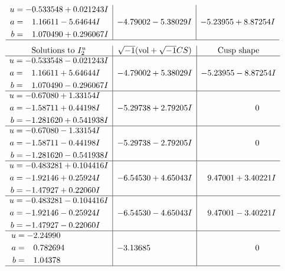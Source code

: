 \documentclass[1p]{elsarticle_modified}
\theoremstyle{definition}
\newcommand{\I}{\sqrt{-1}}
\begin{document}
$$\begin{array}{c|c|c}
\begin{aligned}
u &= -0.533548 + 0.021243 I \\
a &= \phantom{-}1.16611 - 5.64644 I \\
b &= \phantom{-}1.070490 + 0.296067 I\end{aligned}
 & -4.79002 - 5.38029 I & -5.23955 + 8.87254 I\\
 \hline 
 \end{array}$$\newpage$$\begin{array}{c|c|c}  
\text{Solutions to }I^u_{2}& \I (\text{vol} + \sqrt{-1}CS) & \text{Cusp shape}\\
 \hline 
\begin{aligned}
u &= -0.533548 - 0.021243 I \\
a &= \phantom{-}1.16611 + 5.64644 I \\
b &= \phantom{-}1.070490 - 0.296067 I\end{aligned}
 & -4.79002 + 5.38029 I & -5.23955 - 8.87254 I \\ \hline\begin{aligned}
u &= -0.67080 + 1.33154 I \\
a &= -1.58711 + 0.44198 I \\
b &= -1.281620 + 0.541938 I\end{aligned}
 & -5.29738 + 2.79205 I & \phantom{-0.000000 } 0 \\ \hline\begin{aligned}
u &= -0.67080 - 1.33154 I \\
a &= -1.58711 - 0.44198 I \\
b &= -1.281620 - 0.541938 I\end{aligned}
 & -5.29738 - 2.79205 I & \phantom{-0.000000 } 0 \\ \hline\begin{aligned}
u &= -0.483281 + 0.104416 I \\
a &= -1.92146 + 0.25924 I \\
b &= -1.47927 + 0.22060 I\end{aligned}
 & -6.54530 + 4.65043 I & \phantom{-}9.47001 + 3.40221 I \\ \hline\begin{aligned}
u &= -0.483281 - 0.104416 I \\
a &= -1.92146 - 0.25924 I \\
b &= -1.47927 - 0.22060 I\end{aligned}
 & -6.54530 - 4.65043 I & \phantom{-}9.47001 - 3.40221 I \\ \hline\begin{aligned}
u &= -2.24990\phantom{ +0.000000I} \\
a &= \phantom{-}0.782694\phantom{ +0.000000I} \\
b &= \phantom{-}1.04378\phantom{ +0.000000I}\end{aligned}
 & -3.13685\phantom{ +0.000000I} & \phantom{-0.000000 } 0\\
 \hline 
 \end{array}$$\newpage
\end{document}
